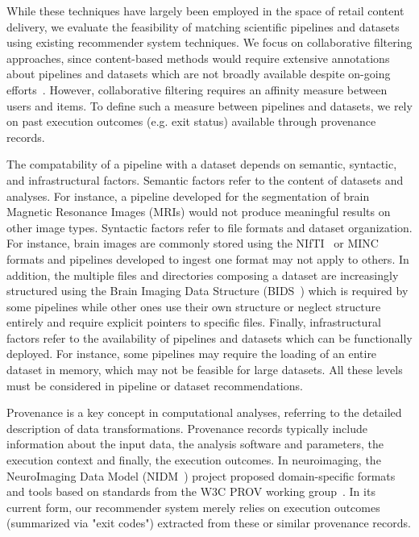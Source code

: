  While these techniques have largely been employed in the space of retail
 content delivery, we evaluate the feasibility of matching scientific pipelines and datasets
 using existing recommender system techniques. We focus on collaborative
 filtering approaches, since content-based methods would require extensive
 annotations about pipelines and datasets which are not broadly available
 despite on-going
 efforts~\cite{NeuroimagingDataModel,sansone2017dats,DATSDocumentation}.
 However, collaborative filtering requires an affinity measure
 between users and items. To define such a measure between pipelines and
 datasets, we rely on past execution outcomes (e.g. exit status) available through provenance records.

The compatability of a pipeline with a dataset depends on
semantic, syntactic, and infrastructural factors. Semantic factors refer to
the content of datasets and analyses. For instance, a pipeline developed
for the segmentation of brain Magnetic Resonance Images (MRIs) would not produce
meaningful results on other image types. Syntactic factors refer to file
formats and dataset organization. For instance, brain images are commonly
stored using the NIfTI~\cite{larobina2014medical} or
MINC~\cite{vincent2016minc} formats and pipelines developed to ingest one
format may not apply to others. In addition, the multiple files and
directories composing a dataset are increasingly structured using the Brain
Imaging Data Structure (BIDS~\cite{bids}) which is required by some
pipelines while other ones use their own structure or neglect structure entirely and require explicit pointers to specific files. Finally,
infrastructural factors refer to the availability of pipelines
and datasets which can be functionally deployed. For instance, some pipelines may require the loading of an
entire dataset in memory, which may not be feasible for large datasets. All
these levels must be considered in pipeline or dataset recommendations.

Provenance is a key concept in computational analyses, referring to the
detailed description of data transformations. Provenance records typically include
information about the input data, the analysis
software and parameters, the execution context and finally, the execution outcomes. In neuroimaging, the NeuroImaging Data Model (NIDM~\cite{maumet2016sharing}) project proposed domain-specific
formats and tools based on standards from the W3C PROV working
group~\cite{missier2013w3c}. In its current form, our
recommender system merely relies on execution outcomes (summarized via "exit codes")
extracted from these or similar provenance records.

